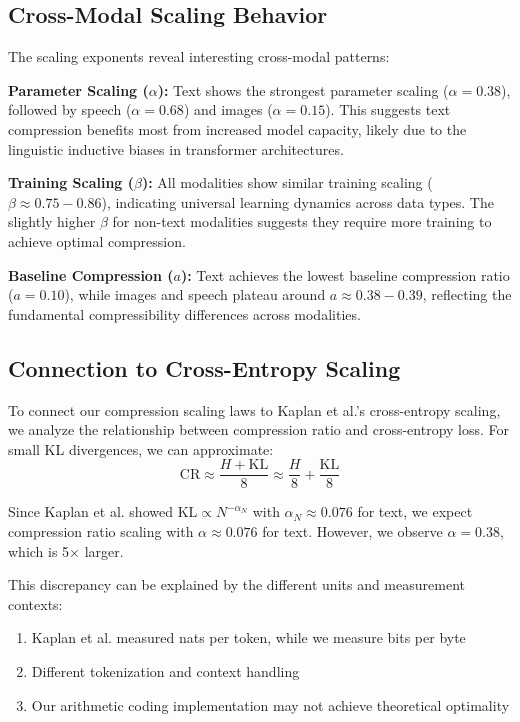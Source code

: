 \documentclass[11pt]{article}
\begin{document}
\subsection{Cross-Modal Scaling Behavior}

The scaling exponents reveal interesting cross-modal patterns:

\textbf{Parameter Scaling ($\alpha$):} Text shows the strongest parameter scaling ($\alpha = 0.38$), followed by speech ($\alpha = 0.68$) and images ($\alpha = 0.15$). This suggests text compression benefits most from increased model capacity, likely due to the linguistic inductive biases in transformer architectures.

\textbf{Training Scaling ($\beta$):} All modalities show similar training scaling ($\beta \approx 0.75-0.86$), indicating universal learning dynamics across data types. The slightly higher $\beta$ for non-text modalities suggests they require more training to achieve optimal compression.

\textbf{Baseline Compression ($a$):} Text achieves the lowest baseline compression ratio ($a = 0.10$), while images and speech plateau around $a \approx 0.38-0.39$, reflecting the fundamental compressibility differences across modalities.

\subsection{Connection to Cross-Entropy Scaling}

To connect our compression scaling laws to Kaplan et al.'s cross-entropy scaling, we analyze the relationship between compression ratio and cross-entropy loss. For small KL divergences, we can approximate:
\[
\mathrm{CR} \approx \frac{H + \mathrm{KL}}{8} \approx \frac{H}{8} + \frac{\mathrm{KL}}{8}
\]

Since Kaplan et al. showed $\mathrm{KL} \propto N^{-\alpha_N}$ with $\alpha_N \approx 0.076$ for text, we expect compression ratio scaling with $\alpha \approx 0.076$ for text. However, we observe $\alpha = 0.38$, which is 5× larger.

This discrepancy can be explained by the different units and measurement contexts:
\begin{enumerate}
\item Kaplan et al. measured nats per token, while we measure bits per byte
\item Different tokenization and context handling
\item Our arithmetic coding implementation may not achieve theoretical optimality
\end{enumerate}
\end{document}
